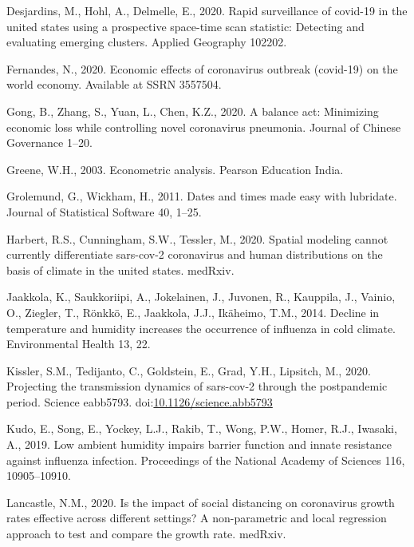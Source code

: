 \documentclass[]{elsarticle} %
\begin{document}
\leavevmode\hypertarget{ref-Desjardins2020rapid}{}%
Desjardins, M., Hohl, A., Delmelle, E., 2020. Rapid surveillance of
covid-19 in the united states using a prospective space-time scan
statistic: Detecting and evaluating emerging clusters. Applied Geography
102202.

\leavevmode\hypertarget{ref-Fernandes2020economic}{}%
Fernandes, N., 2020. Economic effects of coronavirus outbreak (covid-19)
on the world economy. Available at SSRN 3557504.

\leavevmode\hypertarget{ref-Gong2020balance}{}%
Gong, B., Zhang, S., Yuan, L., Chen, K.Z., 2020. A balance act:
Minimizing economic loss while controlling novel coronavirus pneumonia.
Journal of Chinese Governance 1--20.

\leavevmode\hypertarget{ref-Greene2003econometric}{}%
Greene, W.H., 2003. Econometric analysis. Pearson Education India.

\leavevmode\hypertarget{ref-Grolemund2011dates}{}%
Grolemund, G., Wickham, H., 2011. Dates and times made easy with
lubridate. Journal of Statistical Software 40, 1--25.

\leavevmode\hypertarget{ref-Harbert2020spatial}{}%
Harbert, R.S., Cunningham, S.W., Tessler, M., 2020. Spatial modeling
cannot currently differentiate sars-cov-2 coronavirus and human
distributions on the basis of climate in the united states. medRxiv.

\leavevmode\hypertarget{ref-Jaakkola2014decline}{}%
Jaakkola, K., Saukkoriipi, A., Jokelainen, J., Juvonen, R., Kauppila,
J., Vainio, O., Ziegler, T., Rönkkö, E., Jaakkola, J.J., Ikäheimo, T.M.,
2014. Decline in temperature and humidity increases the occurrence of
influenza in cold climate. Environmental Health 13, 22.

\leavevmode\hypertarget{ref-Kissler2020projecting}{}%
Kissler, S.M., Tedijanto, C., Goldstein, E., Grad, Y.H., Lipsitch, M.,
2020. Projecting the transmission dynamics of sars-cov-2 through the
postpandemic period. Science eabb5793.
doi:\href{https://doi.org/10.1126/science.abb5793}{10.1126/science.abb5793}

\leavevmode\hypertarget{ref-Kudo2019low}{}%
Kudo, E., Song, E., Yockey, L.J., Rakib, T., Wong, P.W., Homer, R.J.,
Iwasaki, A., 2019. Low ambient humidity impairs barrier function and
innate resistance against influenza infection. Proceedings of the
National Academy of Sciences 116, 10905--10910.

\leavevmode\hypertarget{ref-Lancastle2020impact}{}%
Lancastle, N.M., 2020. Is the impact of social distancing on coronavirus
growth rates effective across different settings? A non-parametric and
local regression approach to test and compare the growth rate. medRxiv.
\end{document}
